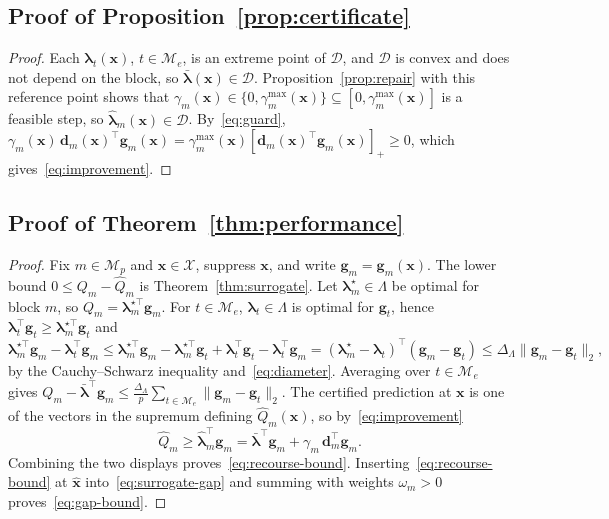 \subsection{Proof of Proposition~\ref{prop:certificate}}
\begin{proof}
Each $\boldsymbol\lambda_t(\mathbf x)$, $t\in\mathcal M_e$, is an extreme point of $\mathcal D$, and $\mathcal D$ is convex and does not depend on the block, so $\bar{\boldsymbol\lambda}(\mathbf x)\in\mathcal D$. Proposition~\ref{prop:repair} with this reference point shows that $\gamma_m(\mathbf x)\in\{0,\gamma_m^{\max}(\mathbf x)\}\subseteq[0,\gamma_m^{\max}(\mathbf x)]$ is a feasible step, so $\widehat{\boldsymbol\lambda}_m(\mathbf x)\in\mathcal D$. By~\eqref{eq:guard}, $\gamma_m(\mathbf x)\,\mathbf d_m(\mathbf x)^\top\mathbf g_m(\mathbf x)=\gamma_m^{\max}(\mathbf x)[\mathbf d_m(\mathbf x)^\top\mathbf g_m(\mathbf x)]_+\ge0$, which gives~\eqref{eq:improvement}.
\end{proof}

\subsection{Proof of Theorem~\ref{thm:performance}}
\begin{proof}
Fix $m\in\mathcal M_p$ and $\mathbf x\in\mathcal X$, suppress $\mathbf x$, and write $\mathbf g_m=\mathbf g_m(\mathbf x)$. The lower bound $0\le Q_m-\widehat Q_m$ is Theorem~\ref{thm:surrogate}. Let $\boldsymbol\lambda_m^\star\in\Lambda$ be optimal for block $m$, so $Q_m=\boldsymbol\lambda_m^{\star\top}\mathbf g_m$. For $t\in\mathcal M_e$, $\boldsymbol\lambda_t\in\Lambda$ is optimal for $\mathbf g_t$, hence $\boldsymbol\lambda_t^\top\mathbf g_t\ge\boldsymbol\lambda_m^{\star\top}\mathbf g_t$ and
\[
\boldsymbol\lambda_m^{\star\top}\mathbf g_m-\boldsymbol\lambda_t^\top\mathbf g_m
\le\boldsymbol\lambda_m^{\star\top}\mathbf g_m-\boldsymbol\lambda_m^{\star\top}\mathbf g_t+\boldsymbol\lambda_t^\top\mathbf g_t-\boldsymbol\lambda_t^\top\mathbf g_m
=(\boldsymbol\lambda_m^\star-\boldsymbol\lambda_t)^\top(\mathbf g_m-\mathbf g_t)
\le\Delta_\Lambda\|\mathbf g_m-\mathbf g_t\|_2,
\]
by the Cauchy--Schwarz inequality and~\eqref{eq:diameter}. Averaging over $t\in\mathcal M_e$ gives $Q_m-\bar{\boldsymbol\lambda}^\top\mathbf g_m\le\frac{\Delta_\Lambda}{p}\sum_{t\in\mathcal M_e}\|\mathbf g_m-\mathbf g_t\|_2$. The certified prediction at $\mathbf x$ is one of the vectors in the supremum defining $\widehat Q_m(\mathbf x)$, so by~\eqref{eq:improvement}
\[
\widehat Q_m\ge\widehat{\boldsymbol\lambda}_m^\top\mathbf g_m=\bar{\boldsymbol\lambda}^\top\mathbf g_m+\gamma_m\,\mathbf d_m^\top\mathbf g_m .
\]
Combining the two displays proves~\eqref{eq:recourse-bound}. Inserting~\eqref{eq:recourse-bound} at $\widehat{\mathbf x}$ into~\eqref{eq:surrogate-gap} and summing with weights $\omega_m>0$ proves~\eqref{eq:gap-bound}.
\end{proof}


